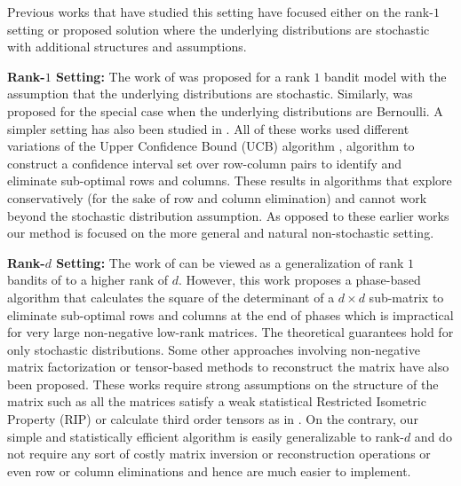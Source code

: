 Previous works that have studied this setting have focused either on the rank-$1$ setting or proposed solution where the underlying distributions are stochastic with additional structures and assumptions.

\textbf{Rank-$1$ Setting:} The work of \citet{katariya2016stochastic} was proposed for a rank $1$ bandit model with the assumption that the underlying distributions are stochastic. Similarly, \citet{katariya2017bernoulli} was proposed for the special case when the underlying distributions are Bernoulli. A simpler setting has also been studied in \citet{maillard2014latent}. All of these works used different variations of the Upper Confidence Bound (UCB) algorithm \cite{auer2002finite}, \citep{auer2010ucb} algorithm to construct a confidence interval set over row-column pairs to identify and eliminate sub-optimal rows and columns. These results in algorithms that explore conservatively (for the sake of row and column elimination) and cannot work beyond the stochastic distribution assumption. As opposed to these earlier works our method is focused on the more general and natural non-stochastic setting.



\textbf{Rank-$d$ Setting:} The work of \citet{kveton2017stochastic} can be viewed as a generalization of rank $1$ bandits of \citet{katariya2016stochastic} to a higher rank of $d$. However, this work proposes a phase-based algorithm that calculates the square of the determinant of a $d\times d$ sub-matrix to eliminate sub-optimal rows and columns at the end of phases which is impractical for very large non-negative low-rank matrices. The theoretical guarantees hold for only stochastic distributions. Some other approaches involving non-negative matrix factorization \citet{sen2016contextual} or tensor-based methods \citep{gopalan2016low} to reconstruct the matrix have also been proposed. These works require strong assumptions on the structure of the matrix such as all the matrices satisfy a weak statistical Restricted Isometric Property (RIP) or calculate third order tensors as in \citet{anandkumar2014tensor}. On the contrary, our simple and statistically efficient algorithm is easily generalizable to rank-$d$ and do not require any sort of costly matrix inversion or reconstruction operations or even row or column eliminations and hence are much easier to implement. 

